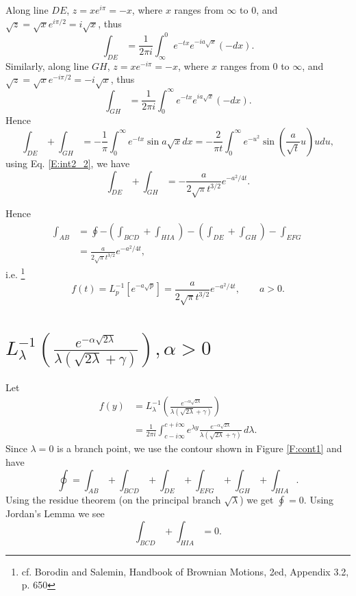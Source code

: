 Along line $DE$, $z=x e^{i\pi}=-x$, where $x$ ranges from $\infty$ to $0$, and 
$\sqrt{z}=\sqrt{x} e^{i\pi /2}= i\sqrt{x}$, thus
\[
	\int_{DE} = \frac{1}{2\pi i} \int_{\infty}^0 e^{-tx} e^{-i a \sqrt{x}} (-dx).
\]
Similarly, along line $GH$, $z=x e^{-i\pi}=-x$, where $x$ ranges from $0$ to
$\infty$, and $\sqrt{z}=\sqrt{x} e^{-i\pi/2} = -i\sqrt{x}$, thus 
\[
	\int_{GH} = \frac{1}{2\pi i} \int^{\infty}_0 e^{-tx} e^{i a \sqrt{x}} (-dx).
\]
Hence
\[
	\int_{DE} + \int_{GH}
	= -\frac{1}{\pi} \int_0^{\infty} e^{-tx} \sin a\sqrt{x} dx
	= -\frac{2}{\pi t} 
	  \int_0^{\infty} e^{-u^2} \sin \left( \frac{a}{\sqrt{t}} u \right) u du,
\]
using Eq. \ref{E:int2_2}, we have
\[
	\int_{DE} + \int_{GH}
	= - \frac{a}{2\sqrt{\pi} t^{3/2}} e^{-a^2/4t}.
\]

Hence 
\begin{align*}
  \int_{AB} 
	&= \oint - \left( \int_{BCD} + \int_{HIA} \right)
     - \left( \int_{DE} + \int_{GH} \right) - \int_{EFG}  \\
  &= \frac{a}{2\sqrt{\pi} t^{3/2}} e^{-a^2/4t}, 
\end{align*}
i.e.
\footnote{cf. Borodin and Salemin, Handbook of Brownian Motions, 2ed, Appendix
3.2, p. 650}
\begin{equation} \label{E:ilt_1a}
	f(t)= L_p^{-1}\left[ e^{-a\sqrt{p}} \right]
      = \frac{a}{2\sqrt{\pi} t^{3/2}} e^{-a^2/4t}, \qquad a>0.
\end{equation}

\section{$ L_{\lambda}^{-1} 
\left( \frac{e^{-\alpha \sqrt{2\lambda}}}{\lambda(\sqrt{2\lambda}+\gamma)}
\right), \alpha > 0 $}
Let
\begin{align*}
  f(y) &= L_{\lambda}^{-1} 
          \left( 
            \frac{e^{-\alpha \sqrt{2\lambda}}}{\lambda(\sqrt{2\lambda}+\gamma)} 
          \right)    \\
       &= \frac{1}{2\pi i}   
           \int_{c-i\infty}^{c+i\infty} e^{\lambda y} 
           \frac{e^{-\alpha \sqrt{2\lambda}}}{\lambda(\sqrt{2\lambda}+\gamma)} 
           \, d\lambda.
\end{align*}
Since $\lambda=0$ is a branch point, we use the contour shown in Figure
\ref{F:cont1} and have
\[
  \oint = \int_{AB} + \int_{BCD} + \int_{DE} + \int_{EFG} + \int_{GH}
          + \int_{HIA}.
\]
Using the residue theorem (on the principal branch $\sqrt{\lambda}$) we get 
$\oint=0$. Using Jordan's Lemma we see
\[
  \int_{BCD} + \int_{HIA} = 0.
\]


